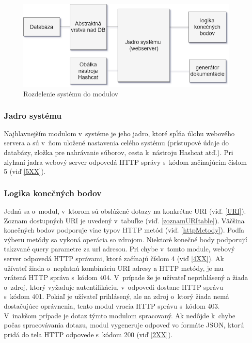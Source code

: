 \documentclass[slovak]{fitthesis}
\begin{document}
\begin{figure}[h]
    \centering
    \includegraphics[scale=0.6]{obrazky/moduly.png}
    \caption{Rozdelenie systému do modulov}
    \label{fig:moduly}
\end{figure}

\subsubsection{Jadro systému}
Najhlavnejším modulom v~systéme je jeho jadro, ktoré spĺňa úlohu webového servera a sú v~ňom uložené nastavenia celého systému (prístupové údaje do databázy, zložka pre nahrávanie súborov, cesta k~nástroju Hashcat atď.). Pri zlyhaní jadra webový server odpovedá HTTP správy s~kódom začínajúcim číslom 5 (viď \ref{5XX}).


\subsubsection{Logika konečných bodov}
Jedná sa o~modul, v~ktorom sú obslúžené dotazy na konkrétne URI (viď. \ref{URI}). Zoznam dostupných URI je uvedený v~tabuľke (viď. \ref{zoznamURItable}). Väčšina konečných bodov podporuje viac typov HTTP metód (viď. \ref{httpMetody}). Podľa výberu metódy sa vykoná operácia so zdrojom. Niektoré konečné body podporujú takzvané query parametre za url adresou. Pri chybe v~tomto module, webový server odpovedá HTTP správami, ktoré začínajú číslom 4 (viď \ref{4XX}). Ak užívateľ žiada o~neplatnú kombináciu URI adresy a HTTP metódy, je mu vrátená HTTP správa s~kódom 404. V~prípade že je užívateľ neprihlásený a žiada o~zdroj, ktorý vyžaduje autentifikáciu, v~odpovedi dostane HTTP správu s~kódom 401. Pokiaľ je užívateľ prihlásený, ale na zdroj o~ktorý žiada nemá dostačujúce oprávnenia, tento modul vracia HTTP správu s~kódom 403. V~inakšom prípade je dotaz týmto modulom spracovaný. Ak nedôjde k~chybe počas spracovávania dotazu, modul vygeneruje odpoveď vo formáte JSON, ktorú pridá do tela HTTP odpovede s~kódom 200 (viď \ref{2XX}).
\end{document}
